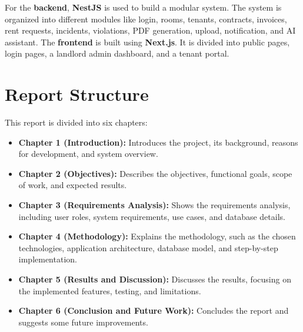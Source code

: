For the \textbf{backend}, \textbf{NestJS} is used to build a modular system. The system is organized into different modules like login, rooms, tenants, contracts, invoices, rent requests, incidents, violations, PDF generation, upload, notification, and AI assistant. The \textbf{frontend} is built using \textbf{Next.js}. It is divided into public pages, login pages, a landlord admin dashboard, and a tenant portal.

\section{Report Structure}
This report is divided into six chapters:

\begin{itemize}
    \item \textbf{Chapter 1 (Introduction):} Introduces the project, its background, reasons for development, and system overview.
    \item \textbf{Chapter 2 (Objectives):} Describes the objectives, functional goals, scope of work, and expected results.
    \item \textbf{Chapter 3 (Requirements Analysis):} Shows the requirements analysis, including user roles, system requirements, use cases, and database details.
    \item \textbf{Chapter 4 (Methodology):} Explains the methodology, such as the chosen technologies, application architecture, database model, and step-by-step implementation.
    \item \textbf{Chapter 5 (Results and Discussion):} Discusses the results, focusing on the implemented features, testing, and limitations.
    \item \textbf{Chapter 6 (Conclusion and Future Work):} Concludes the report and suggests some future improvements.
\end{itemize}

